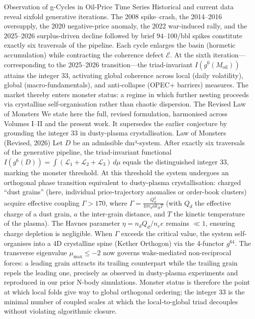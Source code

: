 Observation of g-Cycles in Oil-Price Time Series
Historical and current data reveal sixfold generative iterations. The 2008 spike–crash, the 2014–2016 oversupply, the 2020 negative-price anomaly, the 2022 war-induced rally, and the 2025–2026 surplus-driven decline followed by brief $94–$100/bbl spikes constitute exactly six traversals of the pipeline. Each cycle enlarges the basin (hormetic accumulation) while contracting the coherence defect $  \mathcal{E}  $. At the sixth iteration—corresponding to the 2025–2026 transition—the triad-invariant $  I(g^6(M_{\text{oil}}))  $ attains the integer 33, activating global coherence across local (daily volatility), global (macro-fundamentals), and anti-collapse (OPEC+ barriers) measures. The market thereby enters monster status: a regime in which further nesting proceeds via crystalline self-organisation rather than chaotic dispersion.
The Revised Law of Monsters
We state here the full, revised formulation, harmonised across Volumes I–II and the present work. It supersedes the earlier conjecture by grounding the integer 33 in dusty-plasma crystallisation.
Law of Monsters (Revised, 2026)
Let $  D  $ be an admissible dm³-system. After exactly six traversals of the generative pipeline, the triad-invariant functional
$   I(g^6(D)) = \int (\mathcal{L}_1 + \mathcal{L}_2 + \mathcal{L}_3) \, d\mu   $
equals the distinguished integer 33, marking the monster threshold. At this threshold the system undergoes an orthogonal phase transition equivalent to dusty-plasma crystallisation: charged “dust grains” (here, individual price-trajectory anomalies or order-book clusters) acquire effective coupling $  \Gamma > 170  $, where
$   \Gamma = \frac{Q_d^2}{4\pi \epsilon_0 a k_B T}   $
(with $  Q_d  $ the effective charge of a dust grain, $  a  $ the inter-grain distance, and $  T  $ the kinetic temperature of the plasma). The Havnes parameter $  \eta = n_d Q_d / n_e e  $ remains $  \ll 1  $, ensuring charge depletion is negligible. When $  \Gamma  $ exceeds the critical value, the system self-organises into a 4D crystalline spine (Kether Orthogon) via the 4-functor $  g^{64}  $. The transverse eigenvalue $  \mu_{\max} \le -2  $ now governs wake-mediated non-reciprocal forces: a leading grain attracts its trailing counterpart while the trailing grain repels the leading one, precisely as observed in dusty-plasma experiments and reproduced in our prior N-body simulations. Monster status is therefore the point at which local folds give way to global orthogonal ordering; the integer 33 is the minimal number of coupled scales at which the local-to-global triad decouples without violating algorithmic closure.
